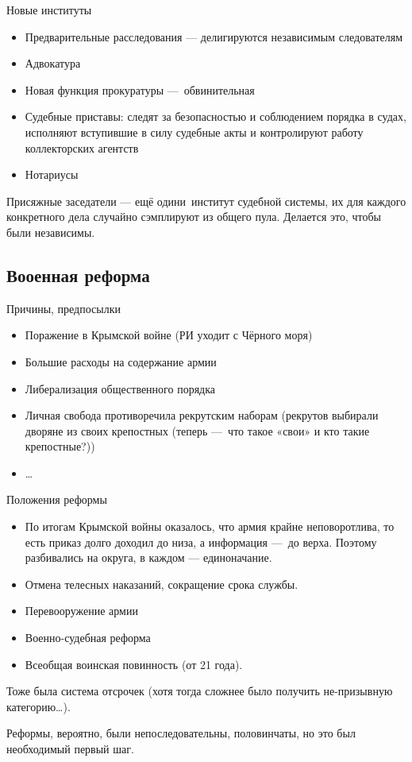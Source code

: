 \documentclass[12pt, a4paper]{article}
\begin{document}
Новые институты
\begin{itemize}
    \item Предварительные расследования — делигируются независимым следователям
    \item Адвокатура
    \item Новая функция прокуратуры — обвинительная
    \item Судебные приставы: следят за безопасностью и соблюдением порядка в судах, 
    исполняют вступившие в силу судебные акты и контролируют работу коллекторских агентств
    \item Нотариусы
\end{itemize}

Присяжные заседатели — ещё одини институт судебной системы, 
их для каждого конкретного дела случайно сэмплируют из общего пула.
Делается это, чтобы были независимы.


\subsection{Вооенная реформа}

Причины, предпосылки
\begin{itemize}
    \item Поражение в Крымской войне (РИ уходит с Чёрного моря)
    \item Большие расходы на содержание армии 
    \item Либерализация общественного порядка
    \item Личная свобода противоречила рекрутским наборам (рекрутов выбирали дворяне из своих крепостных (теперь — что такое «свои» и кто такие крепостные?))
    \item …
\end{itemize}

Положения реформы

\begin{itemize}
    \item По итогам Крымской войны оказалось, что армия крайне неповоротлива, то есть приказ долго доходил до низа, а информация — до верха.
    Поэтому разбивались на округа, в каждом — единоначание.
    \item Отмена телесных наказаний, сокращение срока службы.
    \item Перевооружение армии
    \item Военно-судебная реформа
    \item Всеобщая воинская повинность (от 21 года).
\end{itemize}

Тоже была система отсрочек (хотя тогда сложнее было получить не-призывную категорию…).

Реформы, вероятно, были непоследовательны, половинчаты, но это был необходимый первый шаг.
\end{document}
